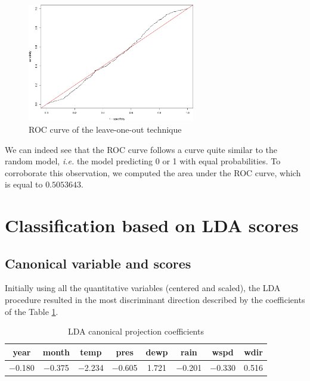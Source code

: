 \documentclass[a4paper, 12pt]{article}
\begin{document}
    \begin{figure}[h]
        \centering
        \includegraphics[width=0.65\textwidth]{resources/pdf/ROCCurve.pdf}
        \caption{ROC curve of the leave-one-out technique}
        \label{fig:ROC_curve}
    \end{figure}
    
    We can indeed see that the ROC curve follows a curve quite similar to the random model, \textit{i.e.} the model predicting 0 or 1 with equal probabilities. To corroborate this observation, we computed the area under the ROC curve, which is equal to $0.5053643$.
    
    \newpage
    
    \section{Classification based on LDA scores}
    
    \subsection{Canonical variable and scores}
    
    Initially using all the quantitative variables (centered and scaled), the LDA procedure resulted in the most discriminant direction described by the coefficients of the Table \ref{tab:lda_coef}. 
    
    \begin{table}[h]
	    \centering
	    \begin{tabular}{cccccccc}
	        year & month & temp & pres & dewp & rain & wspd & wdir \\
	        \hline
	        \num{-0.180} & \num{-0.375} & \num{-2.234} & \num{-0.605} & \num{1.721} & \num{-0.201} & \num{-0.330} & \num{0.516}
	    \end{tabular}
	    \caption{LDA canonical projection coefficients}
	    \label{tab:lda_coef}
	\end{table}
	
\end{document}
